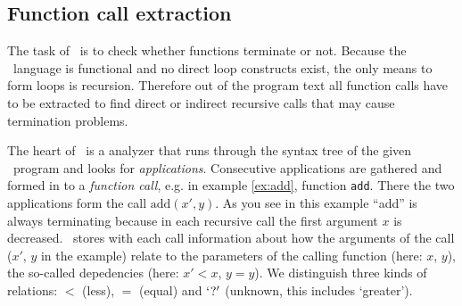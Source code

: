 %

\subsection{Function call extraction\label{sec:funex}}

The task of \foetus\ is to check whether functions terminate or
not. Because the \foetus\ language is functional and no direct loop
constructs  exist, the only means to form loops is
recursion. Therefore out of the program text all function calls have
to be extracted to find direct or indirect recursive calls that may
cause termination problems.

The heart of \foetus\ is a analyzer that runs through the syntax tree of
the given \foetus\ program and looks for {\em applications}.
Consecutive applications are gathered and formed in to a
{\em function call}, e.g. in example \ref{ex:add}, function {\tt add}.
There the two applications  form the call
$\mathrm{add}(x',y)$. As you see in this example ``add'' is always terminating
because in each recursive call the first argument $x$ is
decreased. \foetus\ stores with each call information about how the
arguments of the call ($x'$, $y$ in the example) relate to the parameters
of the calling function (here: $x$, $y$), the so-called depedencies (here:
$x'<x$, $y=y$). We distinguish three kinds of relations: $\less$
(less), $\equal$ (equal) and $`?'$ (unknown, this includes `greater').

